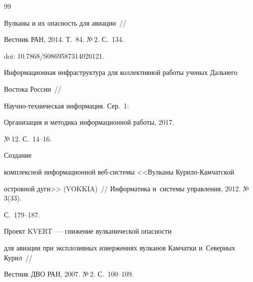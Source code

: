 {\small\frenchspacing


{%




\begin{thebibliography}{99}






Вулканы и их опасность для авиации~/\!\!/


Вестник РАН, 2014. Т.~84. №\,2. С.~134.


 doi: 10.7868\!/\!S0869587314020121.


 









Информационная инфраструктура для коллективной работы ученых Дальнего 


Востока России~/\!\!/


Научно-тех\-ни\-че\-ская информация. Сер.~1: 


Организация и методика информационной работы, 2017.


 №\,12. С.~14--16.


 







 Создание 


комплексной информационной веб-сис\-те\-мы <<Вулканы Ку\-ри\-ло-Кам\-чат\-ской 


островной дуги>> (VOKKIA)~/\!\!/ Информатика и~системы управления, 2012. №\,3(33). 


С.~179--187.




 Проект KVERT~--- снижение вулканической опас\-ности 


для авиации при эксплозивных извержениях вулканов Камчатки и~Северных Курил~/\!\!/ 


Вестник ДВО РАН, 2007. №\,2. С.~100--109.







\end{thebibliography}}}
